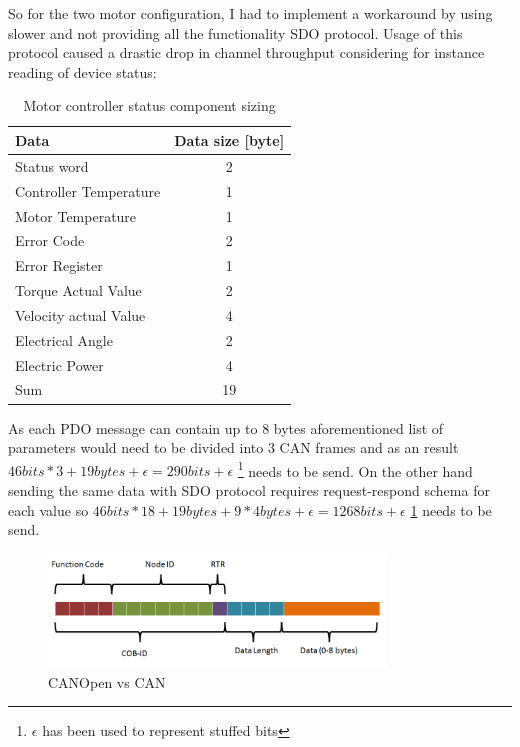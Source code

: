 So for the two motor configuration, I had to implement a workaround by using slower and not providing all the functionality SDO protocol.
Usage of this protocol caused a drastic drop in channel throughput considering for instance reading of device status:
\begin{table}[H]
\centering
\begin{tabular}{|l|c|}
    \hline
    Data & Data size [byte] \\
    \hline
    Status word & 2 \\
    Controller Temperature & 1 \\
    Motor Temperature & 1 \\
    Error Code & 2  \\
    Error Register & 1 \\
    Torque Actual Value & 2  \\
    Velocity actual Value & 4  \\
    Electrical Angle & 2  \\
    Electric Power & 4 \\
    \hline
    \hfill Sum & 19 \\
    \hline
\end{tabular}
\caption{Motor controller status component sizing}
\end{table}

As each PDO message can contain up to 8 bytes aforementioned list of parameters would need to be divided into 3 CAN frames and as an result $46bits*3+19bytes+\epsilon = 290 bits +\epsilon$  \hspace{0.2cm}\footnote{\label{foot:eps}$\epsilon$ has been used to represent stuffed bits} needs to be send. On the other hand sending the same data with SDO protocol requires request-respond schema for each value so $46bits*18 + 19bytes + 9*4bytes + \epsilon = 1268 bits + \epsilon$ \hspace{0.2cm} \ref{foot:eps} needs to be send.

\begin{figure}[h]
    \centering
    \includegraphics[width=0.8\textwidth]{figures/CANOpen vs CAN.png}
    \caption{CANOpen vs CAN}
    \label{fig:canopen_bitwise}
\end{figure}

